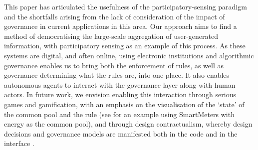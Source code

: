 This paper has articulated the usefulness of the participatory-sensing paradigm and the shortfalls arising from the lack of consideration of the impact of governance in current applications in this area. 
Our approach aims to find a method of democratising the large-scale aggregation of user-generated information, with participatory sensing as an example of this process. As these systems are digital, and often online, using electronic institutions and algorithmic governance enables us to bring both the enforcement of rules, as well as governance determining what the rules are, into one place. It also enables autonomous agents to interact with the governance layer along with human actors. In future work, we envision enabling this interaction through
serious games and gamification, with an emphasis on the visualisation of the `state' of the common pool and the rule
(see \citep{Bourazeri12} for an example using SmartMeters with energy as the common pool), and through
design contractualism, whereby design decisions and governance models are manifested both in the code and in the interface
\citep{Pitt12}.





